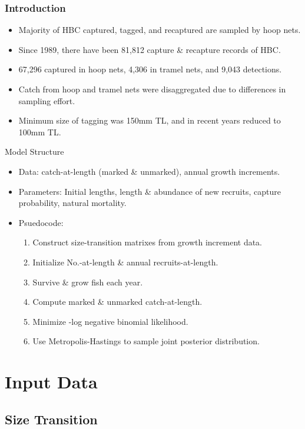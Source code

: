 \documentclass{beamer}
\begin{document}
\begin{frame}
	\frametitle{Introduction}
	{
		\begin{itemize}
			\item Majority of HBC captured, tagged, and recaptured are sampled by hoop nets.
			\item Since 1989, there have been 81,812 capture \& recapture records of HBC.
			\item 67,296 captured in hoop nets, 4,306 in tramel nets, and 9,043 detections.
			\item Catch from hoop and tramel nets were disaggregated due to differences in sampling effort.
			\item Minimum size of tagging was 150mm TL, and in recent years reduced to 100mm TL.
		\end{itemize}
	}
	{
		\begin{block}{Model Structure}
			\begin{itemize}
				\item Data: catch-at-length (marked \& unmarked), annual growth increments.
				\item Parameters: Initial lengths, length \& abundance of new recruits, capture probability, natural mortality.
				\item Psuedocode:
					\begin{enumerate}
						\item Construct size-transition matrixes from growth increment data.
						\item Initialize No.-at-length \& annual recruits-at-length.
						\item Survive \& grow fish each year.
						\item Compute marked \& unmarked catch-at-length.
						\item Minimize -log negative binomial likelihood.
						\item Use Metropolis-Hastings to sample joint posterior distribution.
					\end{enumerate}
			\end{itemize}
		\end{block}
	}
\end{frame}


\section[Data]{Input Data} %
\label{sec:data}

\subsection{Size Transition} %
\label{sub:size_transition}
\end{document}
